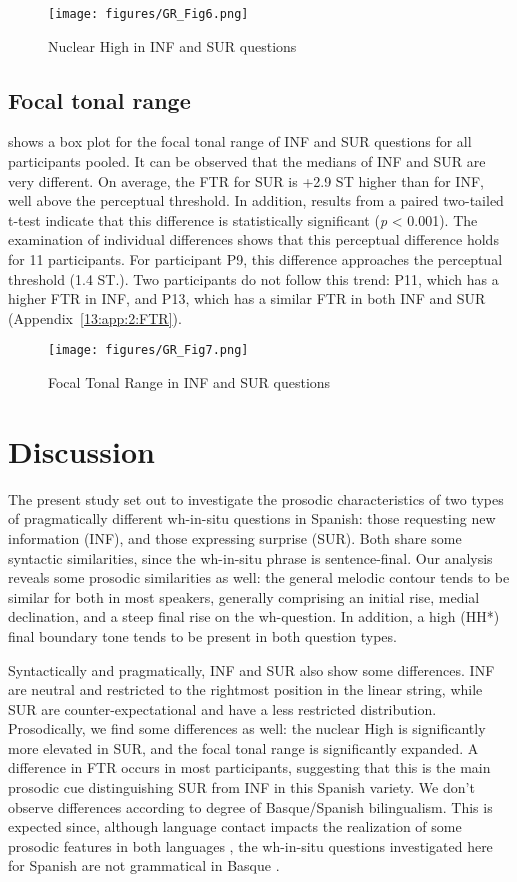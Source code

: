 \documentclass[output=paper,colorlinks,citecolor=brown,draftmode]{langscibook}
\begin{document}
\begin{figure}
    \texttt{[image: figures/GR\_Fig6.png]}
    \caption{Nuclear High in INF and SUR questions}
    \label{13:Fig6}
\end{figure}

\subsection{Focal tonal range}
 shows a box plot for the focal tonal range of INF and SUR questions for all participants pooled. It can be observed that the medians of INF and SUR are very different. On average, the FTR for SUR is +2.9 ST higher than for INF, well above the perceptual threshold. In addition, results from a paired two-tailed t-test indicate that this difference is statistically significant (\textit{p} < 0.001). The examination of individual differences shows that this perceptual difference holds for 11 participants. For participant P9, this difference approaches the perceptual threshold (1.4 ST.). Two participants do not follow this trend: P11, which has a higher FTR in INF, and P13, which has a similar FTR in both INF and SUR (Appendix~\ref{13:app:2:FTR}).

\begin{figure}
    \texttt{[image: figures/GR\_Fig7.png]}
    \caption{Focal Tonal Range in INF and SUR questions}
    \label{13:Fig7}
\end{figure}

\section{Discussion}\label{sec:13:5}
The present study set out to investigate the prosodic characteristics of two types of pragmatically different wh-in-situ questions in Spanish: those requesting new information (INF), and those expressing surprise (SUR). Both share some syntactic similarities, since the wh-in-situ phrase is sentence-final. Our analysis reveals some prosodic similarities as well: the general melodic contour tends to be similar for both in most speakers, generally comprising an initial rise, medial declination, and a steep final rise on the wh-question. In addition, a high (HH*) final boundary tone tends to be present in both question types.

Syntactically and pragmatically, INF and SUR also show some differences. INF are neutral and restricted to the rightmost position in the linear string, while SUR are counter-expectational and have a less restricted distribution. Prosodically, we find some differences as well: the nuclear High is significantly more elevated in SUR, and the focal tonal range is significantly expanded. A difference in FTR occurs in most participants, suggesting that this is the main prosodic cue distinguishing SUR from INF in this Spanish variety. We don’t observe differences according to degree of Basque/Spanish bilingualism. This is expected since, although language contact impacts the realization of some prosodic features in both languages \citep[see for example][]{Elordieta2003}, the wh-in-situ questions investigated here for Spanish are not grammatical in Basque \citep{EtxepareOrtiz2003, reglero2003non}.
\end{document}
